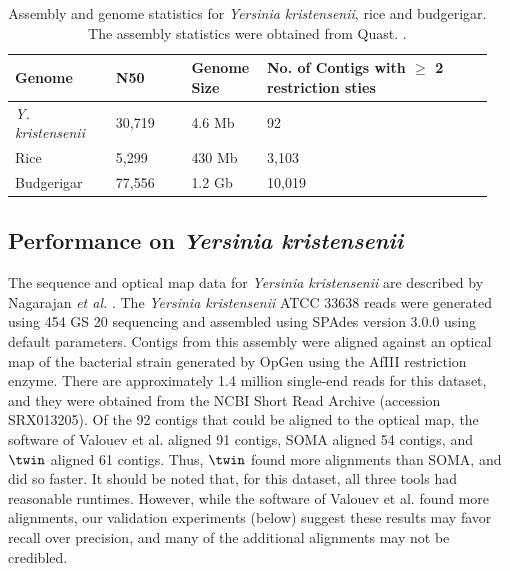 \documentclass[doctor]{thesis}
\begin{document}
\makeatletter{}\begin{table}
\centering
\begin{tabular}{| p{0.20\linewidth} |  
			  p{0.15\linewidth} | 
			  p{0.15\linewidth} | 
			  p{0.45\linewidth} |}
\hline
Genome                     		 			 	& N50   	& Genome Size 		& No. of Contigs with  $\geq$ 2 restriction sties\\
	                     		   		  		
\hline
{\em Y. kristensenii}     	 		         & 30,719 	& 4.6 Mb 				& 92 \\
Rice                       		 		         	& 5,299  	& 430 Mb 				& 3,103 \\
Budgerigar                     	         			         	& 77,556 	& 1.2 Gb 				& 10,019 \\
\hline
\end{tabular}
\caption{Assembly and genome statistics for \emph{Yersinia kristensenii}, rice and budgerigar.  The assembly statistics were obtained from Quast. \cite{QUAST}.}
\label{tab:assembly_stats}
\end{table} 

\subsection{Performance on \emph{Yersinia kristensenii}} \label{sec:pro_genome}

The sequence and optical map data for  \emph{Yersinia kristensenii} are described by Nagarajan {\em et al.} \cite{Nagarajan08}.  The \emph{Yersinia kristensenii} ATCC 33638 reads were generated using 454 GS 20 sequencing and assembled using SPAdes version 3.0.0 \cite{spades} using default parameters.   Contigs from this assembly were aligned against an optical map of the bacterial strain generated by OpGen using the AfIII restriction enzyme.  There are approximately 1.4 million single-end reads for this dataset, and they were obtained from the NCBI Short Read Archive (accession SRX013205).  Of the 92 contigs that could be aligned to the optical map, the software of  Valouev et al. aligned 91 contigs, SOMA aligned 54 contigs, and $\twin$ aligned 61 contigs.  Thus, $\twin$ found more alignments than SOMA, and did so faster. It should be noted that, for this dataset, all three tools had reasonable runtimes. However, while the software of Valouev et al. found more alignments, our validation experiments (below) suggest these results may favor recall over precision, and many of the additional alignments may not be credibled.  
\end{document}
